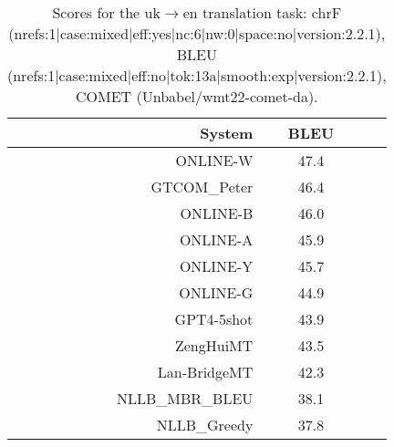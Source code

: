 \documentclass[11pt]{article}
\begin{document}
\begin{table}
\begin{subtable}[t]{0.33\textwidth}
\begin{tabular}{rcc}
\toprule 
System  & BLEU \\ 
\midrule 
\rowcolor{ashgrey} ONLINE-W  & 47.4 \\ 
\rowcolor{ashgrey} GTCOM\_Peter  & 46.4 \\ 
\rowcolor{ashgrey} ONLINE-B  & 46.0 \\ 
\rowcolor{ashgrey} ONLINE-A  & 45.9 \\ 
\rowcolor{ashgrey} ONLINE-Y  & 45.7 \\ 
\rowcolor{ashgrey} ONLINE-G  & 44.9 \\ 
\rowcolor{ashgrey} GPT4-5shot  & 43.9 \\ 
\rowcolor{ashgrey} ZengHuiMT  & 43.5 \\ 
\rowcolor{ashgrey} Lan-BridgeMT  & 42.3 \\ 
\rowcolor{ashgrey} NLLB\_MBR\_BLEU  & 38.1 \\ 
\rowcolor{ashgrey} NLLB\_Greedy  & 37.8 \\ 
\bottomrule 
\end{tabular} 
\end{subtable}  
\caption{Scores for the uk$\rightarrow$en translation task: chrF (nrefs:1|case:mixed|eff:yes|nc:6|nw:0|space:no|version:2.2.1), BLEU (nrefs:1|case:mixed|eff:no|tok:13a|smooth:exp|version:2.2.1), COMET (Unbabel/wmt22-comet-da).} 
\end{table} 
\end{document}
